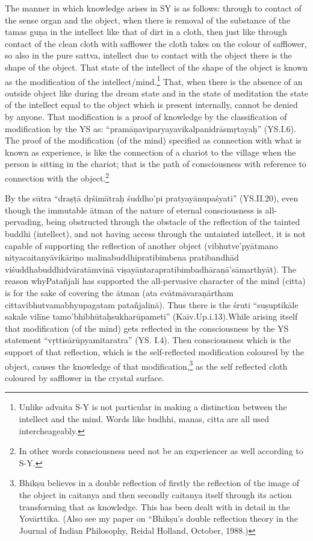 The manner in which knowledge arises in SY is as follows: through to contact of the sense organ and the object, when there is removal of the substance of the tamas guṇa in the intellect like that of dirt in a cloth, then just like through contact of the clean cloth with safflower the cloth takes on the colour of safflower, so also in the pure sattva, intellect due to contact with the object there is the shape of the object. That state of the intellect of the shape of the object is known as the modification of the intellect/mind.\footnote{Unlike advaita S-Y is not particular in making a distinction between the intellect and the mind. Words like budhhi, manas, citta are all used intercheageably.} That, when there is the absence of an outside object like during  the dream state and in the state of meditation the state of the intellect equal to the object which is present internally, cannot be denied by anyone. That modification is a proof of knowledge by the classification of modification by the YS as: “pramāṇaviparyayavikalpanidrāsmṛtayaḥ” (YS.I.6). The proof of the modification (of the mind) specified as connection with what is known as experience, is like the connection of a chariot to the village when the person is sitting in the chariot; that is the path of consciousness with reference to connection with the object.\footnote{In other words consciousness need not be an experiencer as well according to S-Y.} 

By the sūtra “draṣṭā dṛśimātraḥ śuddho’pi pratyayānupaśyati” (YS.\break II.20), even though the immutable ātman of the nature of eternal consciousness is all-pervading, being obstructed through the obstacle of the reflection of the tainted buddhi (intellect), and not having access through the untainted intellect, it is not capable of supporting the reflection of another object (vibhutve’pyātmano nityacaitanyāvikāriṇo malinabuddhipratibimbena pratibandhād viśuddhabuddhidvāratām\break vinā viṣayāntarapratibimbadhāraṇā’sāmarthyāt). The reason why\break Patañjali has supported the all-pervasive character of the mind (citta) is for the sake of covering the ātman (ata evātmāvaraṇārtham cittavibhutvamabhyupagatam patañjalinā). Thus there is the śruti “suṣuptikāle sakale vilīne tamo’bhibhūtaḥsukharūpameti” (Kaiv.Up.i.13).\break While arising itself that modification (of the mind) gets reflected in the consciousness by the YS statement “vṛttisārūpyamitaratra” (YS. I.4). Then consciousness which is the support of that reflection, which is the self-reflected modification coloured by the object, causes the knowledge of that modification,\footnote{Bhikṣu believes in a double reflection of firstly the reflection of the image of the object in caitanya and then secondly caitanya itself through its action transforming that as knowledge. This has been dealt with in detail in the Yovārttika. (Also see my paper on “Bhikṣu’s double reflection theory in the Journal of Indian Philosophy, Reidal Holland, October, 1988.)} as the self reflected cloth coloured by safflower in the crystal surface. 

